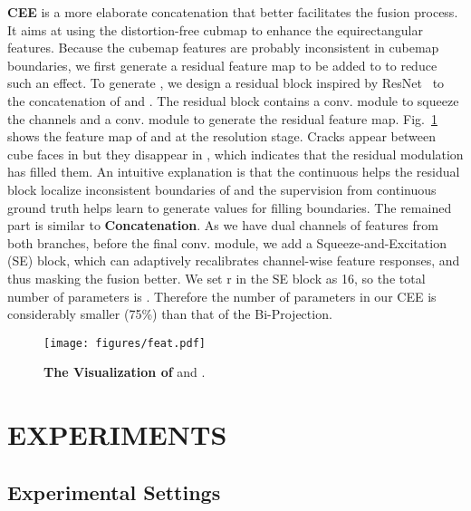 \documentclass[letterpaper, 10 pt, conference]{ieeeconf}
\begin{document}
\textbf{CEE} is a more elaborate concatenation that better facilitates the fusion process. It aims at using the distortion-free cubmap to enhance the equirectangular features. Because the cubemap features are probably inconsistent in cubemap boundaries, we first generate a residual feature map  to be added to  to reduce such an effect. To generate , we design a residual block inspired by ResNet~\cite{he2016deep} to the concatenation of  and . The residual block contains a  conv. module to squeeze the channels and a  conv. module to generate the residual feature map. 
{Fig.~\ref{fig:feat} shows the feature map of  and  at the  resolution stage. Cracks appear between cube faces in  but they disappear in , which indicates that the residual modulation has filled them. An intuitive explanation is that the continuous  helps the residual block localize inconsistent boundaries of  and the supervision from continuous ground truth helps learn to generate values for filling boundaries.}
The remained part is similar to \textbf{Concatenation}. As we have dual channels of features from both branches, before the final  conv. module, we add a Squeeze-and-Excitation (SE) \cite{hu2018squeeze} block, which can adaptively recalibrates channel-wise feature responses, and thus masking the fusion better. We set r in the SE block as 16, so the total number of parameters is . Therefore the number of parameters in our CEE is considerably smaller (75\%) than that of the Bi-Projection.




\begin{figure}[t]
\vspace{5pt}
\begin{center}
\texttt{[image: figures/feat.pdf]}
\end{center}
\caption{\textbf{The Visualization of}  and .}
\label{fig:feat}
\end{figure}


\section{EXPERIMENTS}

\subsection{Experimental Settings}
\end{document}
